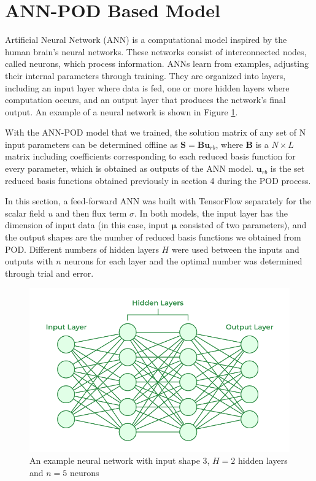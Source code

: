 \section{ANN-POD Based Model}

Artificial Neural Network (ANN) is a computational model inspired by the human brain's neural networks. These networks consist of interconnected nodes, called neurons, which process information. ANNs learn from examples, adjusting their internal parameters through training. They are organized into layers, including an input layer where data is fed, one or more hidden layers where computation occurs, and an output layer that produces the network's final output. An example of a neural network is shown in Figure \ref{fig:neural_network}.

With the ANN-POD model that we trained, the solution matrix of any set of N input parameters can be determined offline as $\mathbf{S} = \mathbf{B}  \mathbf{u}_{rb}$, where $\mathbf{B}$ is a $N \times L$ matrix including coefficients corresponding to each reduced basis function for every parameter, which is obtained as outputs of the ANN model. $ \mathbf{u}_{rb}$ is the set reduced basis functions obtained previously in section 4 during the POD process.

In this section, a feed-forward ANN was built with TensorFlow separately for the scalar field $u$ and then flux term $\sigma$. In both models, the input layer has the dimension of input data (in this case, input $\bm{\mu}$ consisted of two parameters), and the output shapes are the number of reduced basis functions we obtained from POD. Different numbers of hidden layers $H$ were used between the inputs and outputs with $n$ neurons for each layer and the optimal number was determined through trial and error.  

\begin{figure}[!h]
    \centering
    \includegraphics[width=0.55\linewidth]{annpod_fig/Neural_Network.png}
    \caption{An example neural network with input shape 3, $H=2$ hidden layers and $n=5$ neurons}
    \label{fig:neural_network}
\end{figure}


